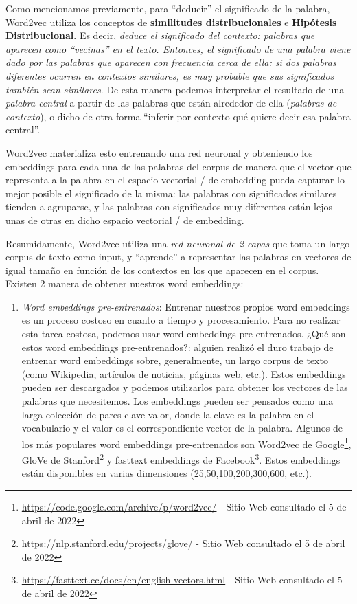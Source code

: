\documentclass[12pt,a4paper]{article}
\begin{document}
\begin{sloppypar}
Como mencionamos previamente, para “deducir” el significado de la palabra, Word2vec utiliza los conceptos de \textbf{similitudes distribucionales} e \textbf{Hipótesis Distribucional}. Es decir, \textit{deduce el significado del contexto: palabras que aparecen como “vecinas” en el texto. Entonces, el significado de una palabra viene dado por las palabras que aparecen con frecuencia cerca de ella: si dos palabras diferentes ocurren en contextos similares, es muy probable que sus significados también sean similares}.  De esta manera podemos interpretar el resultado de una \textit{palabra central} a partir de las palabras que están alrededor de ella (\textit{palabras de contexto}), o dicho de otra forma “inferir por contexto qué quiere decir esa palabra central”. 

Word2vec materializa esto entrenando una red neuronal y obteniendo los embeddings para cada una de las palabras del corpus de manera que el vector que representa a la palabra en el espacio vectorial / de embedding pueda capturar lo mejor posible el significado de la misma: las palabras con significados similares tienden a agruparse, y las palabras con significados muy diferentes están lejos unas de otras en dicho espacio vectorial / de embedding.

Resumidamente, Word2vec utiliza una \textit{red neuronal de 2 capas} que toma un largo corpus de texto como input, y “aprende” a representar las palabras en vectores de igual tamaño en función de los contextos en los que aparecen en el corpus. 
\\

Existen 2 manera de obtener nuestros word embeddings\cite{NLP_26}: 
\begin{enumerate}

\item \textit{Word embeddings pre-entrenados}: Entrenar nuestros propios word embeddings es un proceso costoso en cuanto a tiempo y procesamiento. Para no realizar esta tarea costosa, podemos usar word embeddings pre-entrenados. ¿Qué son estos word embeddings pre-entrenados?: alguien realizó el duro trabajo de entrenar word embeddings sobre, generalmente, un largo corpus de texto (como Wikipedia, artículos de noticias, páginas web, etc.). Estos embeddings pueden ser descargados y podemos utilizarlos para obtener los vectores de las palabras que necesitemos. Los embeddings pueden ser pensados como una larga colección de pares clave-valor, donde la clave es la palabra en el vocabulario y el valor es el correspondiente vector de la palabra. Algunos de los más populares word embeddings pre-entrenados son Word2vec de Google\footnote{\url{https://code.google.com/archive/p/word2vec/} - Sitio Web consultado el 5 de abril de 2022}, GloVe de Stanford\footnote{\url{https://nlp.stanford.edu/projects/glove/} - Sitio Web consultado el 5 de abril de 2022} y fasttext embeddings de Facebook\footnote{\url{https://fasttext.cc/docs/en/english-vectors.html} - Sitio Web consultado el 5 de abril de 2022}. Estos embeddings están disponibles en varias dimensiones (25,50,100,200,300,600, etc.).


\end{enumerate}
\end{sloppypar}
\end{document}
